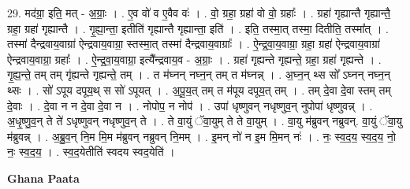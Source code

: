 \documentclass[17pt]{extarticle}
\begin{document}
29. मद॑ग्रा॒ इति॒ मत् - अ॒ग्राः॒ । . ए॒व वो॑ व ए॒वैव वः॑ । . वो॒ ग्रहा॒ ग्रहा॑ वो वो॒ ग्रहाः᳚ । . ग्रहा॑ गृह्यान्तै गृह्यान्तै॒ ग्रहा॒ ग्रहा॑ गृह्यान्तै । . गृ॒ह्या॒न्ता॒ इतीति॑ गृह्यान्तै गृह्यान्ता॒ इति॑ । . इति॒ तस्मा॒त् तस्मा॒ दितीति॒ तस्मा᳚त् । . तस्मा॑ दैन्द्रवाय॒वाग्रा॑ ऐन्द्रवाय॒वाग्रा॒ स्तस्मा॒त् तस्मा॑ दैन्द्रवाय॒वाग्राः᳚ । . ऐ॒न्द्र॒वा॒य॒वाग्रा॒ ग्रहा॒ ग्रहा॑ ऐन्द्रवाय॒वाग्रा॑ ऐन्द्रवाय॒वाग्रा॒ ग्रहाः᳚ । . ऐ॒न्द्र॒वा॒य॒वाग्रा॒ इत्यै᳚न्द्रवाय॒व - अ॒ग्राः॒ । . ग्रहा॑ गृह्यन्ते गृह्यन्ते॒ ग्रहा॒ ग्रहा॑ गृह्यन्ते । . गृ॒ह्य॒न्ते॒ तम् तम् गृ॑ह्यन्ते गृह्यन्ते॒ तम् । . त म॑घ्नन् नघ्न॒न् तम् त म॑घ्नन्न् । . अ॒घ्न॒न् थ्स सो᳚ ऽघ्नन् नघ्न॒न् थ्सः । . सो॑ ऽपूय दपूय॒थ् स सो॑ ऽपूयत् । . अ॒पू॒य॒त् तम् त म॑पूय दपूय॒त् तम् । . तम् दे॒वा दे॒वा स्तम् तम् दे॒वाः । . दे॒वा न न दे॒वा दे॒वा न । . नोपोप॒ न नोप॑ । . उपा॑ धृष्णुवन् नधृष्णुव॒न् नुपोपा॑ धृष्णुवन्न् । . अ॒धृ॒ष्णु॒व॒न् ते ते॑ ऽधृष्णुवन् नधृष्णुव॒न् ते । . ते वा॒युं ॅवा॒युम् ते ते वा॒युम् । . वा॒यु म॑ब्रुवन् नब्रुवन्. वा॒युं ॅवा॒यु म॑ब्रुवन्न् । . अ॒ब्रु॒व॒न् नि॒म मि॒म म॑ब्रुवन् नब्रुवन् नि॒मम् । . इ॒मन् नो॑ न इ॒म मि॒मन् नः॑ । . नः॒ स्व॒द॒य॒ स्व॒द॒य॒ नो॒ नः॒ स्व॒द॒य॒ । . स्व॒द॒येतीति॑ स्वदय स्वद॒येति॑ । \newline

\textbf{Ghana Paata } \newline
\end{document}
